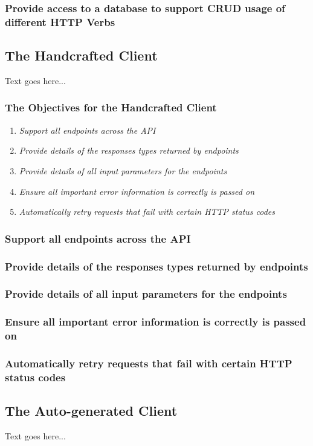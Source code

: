 \subsubsection{Provide access to a database to support CRUD usage of different HTTP Verbs}

\subsection{The Handcrafted Client}
Text goes here...
\subsubsection{The Objectives for the Handcrafted Client}
\begin{enumerate}
    \item \textit{Support all endpoints across the API}
    \item \textit{Provide details of the responses types returned by endpoints}
    \item \textit{Provide details of all input parameters for the endpoints}
    \item \textit{Ensure all important error information is correctly is passed on}
    \item \textit{Automatically retry requests that fail with certain HTTP status codes}
\end{enumerate}
\subsubsection{Support all endpoints across the API}
\subsubsection{Provide details of the responses types returned by endpoints}
\subsubsection{Provide details of all input parameters for the endpoints}
\subsubsection{Ensure all important error information is correctly is passed on}
\subsubsection{Automatically retry requests that fail with certain HTTP status codes}
\subsection{The Auto-generated Client}
Text goes here...
